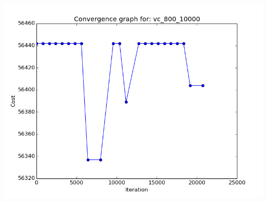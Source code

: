 \documentclass[11pt]{article}
\begin{document}
\begin{center}
\begin{minipage}{0.49\linewidth}
\end{minipage}
\begin{minipage}{0.49\linewidth}
\includegraphics[width=\linewidth]{cg_4.png}
\end{minipage}
\end{center}

\pagebreak
\end{document}
